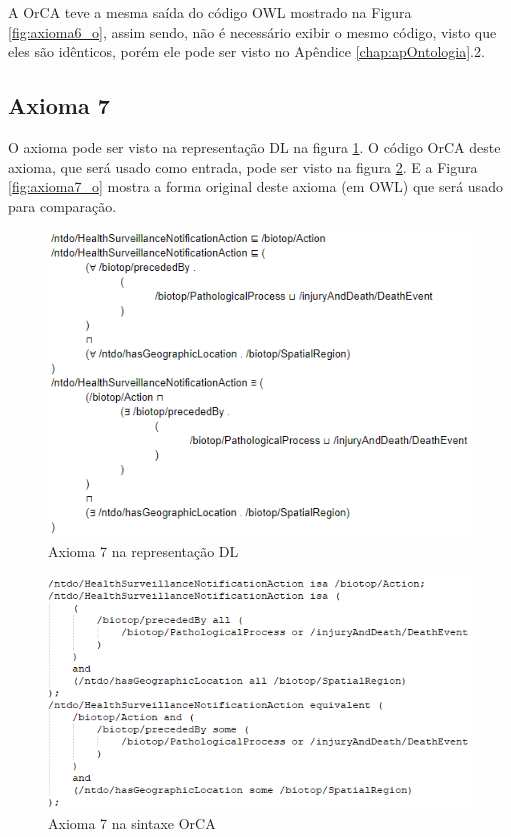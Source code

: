 \documentclass{bcc}
\begin{document}
A OrCA teve a mesma saída do código OWL mostrado na Figura \ref{fig:axioma6_o}, assim sendo, não é necessário exibir o mesmo código, visto que eles são idênticos, porém ele pode ser visto no Apêndice \ref{chap:apOntologia}.2.

\subsection{Axioma 7}
O axioma pode ser visto na representação DL na figura \ref{fig:axioma7_dl}. O código OrCA deste axioma, que será usado como entrada, pode ser visto na figura \ref{fig:axioma7_orca}. E a Figura \ref{fig:axioma7_o} mostra a forma original deste axioma (em OWL) que será usado para comparação. 

\begin{figure}[H]
\centering
\includegraphics[width=.6\textwidth]{Figuras/axioma7_dl.png}
\caption{Axioma 7 na representação DL} 
\label{fig:axioma7_dl}
\end{figure}

\begin{figure}[H]
\centering
\includegraphics[width=.7\textwidth]{Figuras/axioma7_orca.png}
\caption{Axioma 7 na sintaxe OrCA} 
\label{fig:axioma7_orca}
\end{figure}
\end{document}
